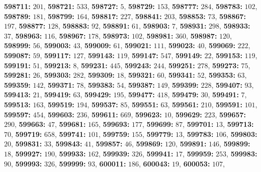 \textsf{\bfseries 598711:} $201$, \textsf{\bfseries 598721:} $533$, \textsf{\bfseries 598727:} $5$, \textsf{\bfseries 598729:} $153$, \textsf{\bfseries 598777:} $284$, \textsf{\bfseries 598783:} $102$, \textsf{\bfseries 598789:} $181$, \textsf{\bfseries 598799:} $164$, \textsf{\bfseries 598817:} $227$, \textsf{\bfseries 598841:} $203$, \textsf{\bfseries 598853:} $73$, \textsf{\bfseries 598867:} $197$, \textsf{\bfseries 598877:} $128$, \textsf{\bfseries 598883:} $92$, \textsf{\bfseries 598891:} $61$, \textsf{\bfseries 598903:} $7$, \textsf{\bfseries 598931:} $298$, \textsf{\bfseries 598933:} $37$, \textsf{\bfseries 598963:} $116$, \textsf{\bfseries 598967:} $178$, \textsf{\bfseries 598973:} $102$, \textsf{\bfseries 598981:} $360$, \textsf{\bfseries 598987:} $120$, \textsf{\bfseries 598999:} $56$, \textsf{\bfseries 599003:} $43$, \textsf{\bfseries 599009:} $61$, \textsf{\bfseries 599021:} $111$, \textsf{\bfseries 599023:} $40$, \textsf{\bfseries 599069:} $222$, \textsf{\bfseries 599087:} $59$, \textsf{\bfseries 599117:} $127$, \textsf{\bfseries 599143:} $119$, \textsf{\bfseries 599147:} $547$, \textsf{\bfseries 599149:} $22$, \textsf{\bfseries 599153:} $119$, \textsf{\bfseries 599191:} $51$, \textsf{\bfseries 599213:} $8$, \textsf{\bfseries 599231:} $445$, \textsf{\bfseries 599243:} $244$, \textsf{\bfseries 599251:} $278$, \textsf{\bfseries 599273:} $75$, \textsf{\bfseries 599281:} $26$, \textsf{\bfseries 599303:} $282$, \textsf{\bfseries 599309:} $18$, \textsf{\bfseries 599321:} $60$, \textsf{\bfseries 599341:} $52$, \textsf{\bfseries 599353:} $63$, \textsf{\bfseries 599359:} $142$, \textsf{\bfseries 599371:} $78$, \textsf{\bfseries 599383:} $54$, \textsf{\bfseries 599387:} $149$, \textsf{\bfseries 599399:} $228$, \textsf{\bfseries 599407:} $93$, \textsf{\bfseries 599413:} $21$, \textsf{\bfseries 599419:} $63$, \textsf{\bfseries 599429:} $195$, \textsf{\bfseries 599477:} $418$, \textsf{\bfseries 599479:} $30$, \textsf{\bfseries 599491:} $7$, \textsf{\bfseries 599513:} $163$, \textsf{\bfseries 599519:} $194$, \textsf{\bfseries 599537:} $85$, \textsf{\bfseries 599551:} $63$, \textsf{\bfseries 599561:} $210$, \textsf{\bfseries 599591:} $101$, \textsf{\bfseries 599597:} $454$, \textsf{\bfseries 599603:} $236$, \textsf{\bfseries 599611:} $669$, \textsf{\bfseries 599623:} $10$, \textsf{\bfseries 599629:} $223$, \textsf{\bfseries 599657:} $290$, \textsf{\bfseries 599663:} $47$, \textsf{\bfseries 599681:} $165$, \textsf{\bfseries 599693:} $177$, \textsf{\bfseries 599699:} $87$, \textsf{\bfseries 599701:} $13$, \textsf{\bfseries 599713:} $70$, \textsf{\bfseries 599719:} $658$, \textsf{\bfseries 599741:} $101$, \textsf{\bfseries 599759:} $155$, \textsf{\bfseries 599779:} $13$, \textsf{\bfseries 599783:} $106$, \textsf{\bfseries 599803:} $20$, \textsf{\bfseries 599831:} $33$, \textsf{\bfseries 599843:} $41$, \textsf{\bfseries 599857:} $46$, \textsf{\bfseries 599869:} $120$, \textsf{\bfseries 599891:} $146$, \textsf{\bfseries 599899:} $18$, \textsf{\bfseries 599927:} $190$, \textsf{\bfseries 599933:} $162$, \textsf{\bfseries 599939:} $326$, \textsf{\bfseries 599941:} $17$, \textsf{\bfseries 599959:} $253$, \textsf{\bfseries 599983:} $90$, \textsf{\bfseries 599993:} $326$, \textsf{\bfseries 599999:} $93$, \textsf{\bfseries 600011:} $186$, \textsf{\bfseries 600043:} $19$, \textsf{\bfseries 600053:} $107$, 
